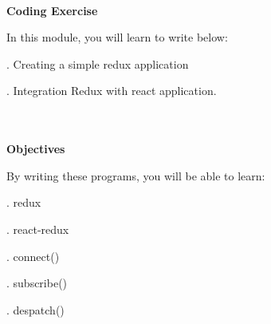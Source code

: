 \documentclass{article}
\begin{document}

\noindent 

\noindent \\
\textbf{Coding Exercise}

\noindent 
In this module, you will learn to write below:

. Creating a simple redux application 

. Integration Redux with react application.

\noindent \\\\

\noindent \textbf{Objectives}

\noindent 
By writing these programs, you will be able to learn:

. redux

. react-redux

. connect()

. subscribe()

. despatch()
\end{document}
